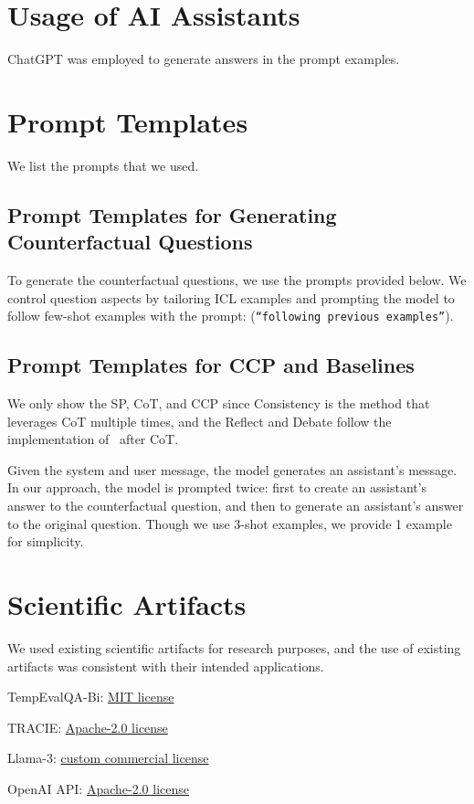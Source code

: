 \section{Usage of AI Assistants}
ChatGPT was employed to generate answers in the prompt examples.


\newpage

\section{Prompt Templates}
We list the prompts that we used.

\subsection{Prompt Templates for Generating Counterfactual Questions}
\label{appndx:prompt_examples_gen_counter_q}

To generate the counterfactual questions, we use the prompts provided below.
We control question aspects by tailoring ICL examples and prompting the model to follow few-shot examples with the prompt: (\texttt{``following previous examples''}). 





\subsection{Prompt Templates for CCP and Baselines}
\label{appndx:prompt_examples_gen_ans}
We only show the SP, CoT, and CCP since Consistency is the method that leverages CoT multiple times, and the Reflect and Debate follow the implementation of~\citet{du2024improving} after CoT. 

Given the system and user message, the model generates an assistant's message. In our approach, the model is prompted twice: first to create an assistant's answer to the counterfactual question, and then to generate an assistant's answer to the original question. Though we use 3-shot examples, we provide 1 example for simplicity.







\section{Scientific Artifacts}

We used existing scientific artifacts for research purposes, and the use of existing artifacts was consistent with their intended applications.

TempEvalQA-Bi: \href{https://github.com/yfqiu-nlp/temporal-llms?tab=MIT-1-ov-file#readme}{MIT license}

TRACIE: \href{https://www.apache.org/licenses/LICENSE-2.0}{Apache-2.0 license}

Llama-3: \href{https://www.llama.com/llama3/license/}{custom commercial license}

OpenAI API: \href{https://www.apache.org/licenses/LICENSE-2.0}{Apache-2.0 license}
